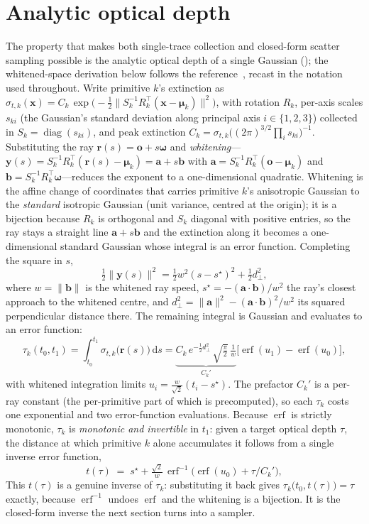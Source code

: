 \section{Analytic optical depth}
\label{sec:analytic-od}

The property that makes both single-trace collection and closed-form scatter sampling possible is the
analytic optical depth of a single Gaussian (); the whitened-space derivation
below follows the reference~\cite{DSYG}, recast in the notation used throughout. Write primitive $k$'s extinction
as $\sigma_{t,k}(\bm{x}) = C_k\,\exp\!\big(-\tfrac12\lVert S_k^{-1}R_k^{\!\top}(\bm{x}-\bm{\mu}_k)\rVert^2\big)$,
with rotation $R_k$, per-axis scales $s_{ki}$ (the Gaussian's standard deviation along principal axis
$i\in\{1,2,3\}$) collected in $S_k=\operatorname{diag}(s_{ki})$, and peak extinction
$C_k=\sigma_{t,k}\big((2\pi)^{3/2}\prod_i s_{ki}\big)^{-1}$. Substituting the ray $\bm{r}(s)=\bm{o}+s\bm{\omega}$
and \emph{whitening}---$\bm{y}(s)=S_k^{-1}R_k^{\!\top}(\bm{r}(s)-\bm{\mu}_k)=\bm{a}+s\bm{b}$ with
$\bm{a}=S_k^{-1}R_k^{\!\top}(\bm{o}-\bm{\mu}_k)$ and $\bm{b}=S_k^{-1}R_k^{\!\top}\bm{\omega}$---reduces the exponent
to a one-dimensional quadratic. Whitening is the affine change of coordinates that carries primitive
$k$'s anisotropic Gaussian to the \emph{standard} isotropic Gaussian (unit variance, centred at the
origin); it is a bijection because $R_k$ is orthogonal and $S_k$ diagonal with positive entries, so the
ray stays a straight line $\bm{a}+s\bm{b}$ and the extinction along it becomes a one-dimensional standard
Gaussian whose integral is an error function. Completing the square in $s$,
\[
  \tfrac12\lVert\bm{y}(s)\rVert^2 = \tfrac12 w^2 (s-s^\star)^2 + \tfrac12 d_\perp^2,
\]
where $w=\lVert\bm{b}\rVert$ is the whitened ray speed, $s^\star=-(\bm{a}\cdot\bm{b})/w^2$ the ray's
closest approach to the whitened centre, and $d_\perp^2=\lVert\bm{a}\rVert^2-(\bm{a}\cdot\bm{b})^2/w^2$
its squared perpendicular distance there. The remaining integral is Gaussian and evaluates to an
error function:
\[
  \tau_k(t_0, t_1) = \int_{t_0}^{t_1}\! \sigma_{t,k}\big(\bm{r}(s)\big)\,\mathrm{d}s
  = \underbrace{C_k\, e^{-\tfrac12 d_\perp^2}\,\sqrt{\tfrac{\pi}{2}}\,\tfrac1w}_{\displaystyle C_k'}
  \big[\operatorname{erf}(u_1) - \operatorname{erf}(u_0)\big],
\]
with whitened integration limits $u_i=\tfrac{w}{\sqrt2}(t_i-s^\star)$.
The prefactor $C_k'$ is a per-ray constant (the per-primitive part of which is precomputed), so each
$\tau_k$ costs one exponential and two error-function evaluations. Because $\operatorname{erf}$ is
strictly monotonic, $\tau_k$ is \emph{monotonic and invertible} in $t_1$: given a target optical depth
$\tau$, the distance at which primitive $k$ alone accumulates it follows from a single inverse error
function,
\[
  t(\tau) \;=\; s^\star + \tfrac{\sqrt2}{w}\,
  \operatorname{erf}^{-1}\!\Big(\operatorname{erf}(u_0) + \tau/C_k'\Big),
\]
This $t(\tau)$ is a genuine inverse of $\tau_k$: substituting it back gives
$\tau_k\big(t_0,t(\tau)\big)=\tau$ exactly, because $\operatorname{erf}^{-1}$ undoes $\operatorname{erf}$
and the whitening is a bijection. It is the closed-form inverse the next section turns into a sampler.

